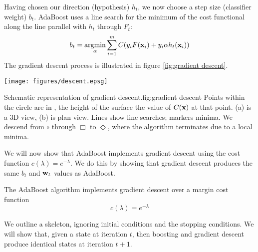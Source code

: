 Having chosen our direction (hypothesis) $h_t$, we now choose a step
size (classifier weight) $b_t$.  AdaBoost uses a line search for the
minimum of the cost functional along the line parallel with $h_t$
through $F_t$:
%
\begin{equation}
b_t = \argmin_{\alpha} \sum_{i=1}^{m} C(y_i F(\bfx_i) + y_i \alpha
h_t(\bfx_i))
\end{equation}
%
The gradient descent process is illustrated in figure
\ref{fig:gradient descent}.

\begin{linefigure}
\begin{center}
\texttt{[image: figures/descent.epsg]}
\end{center}
\begin{capt}{Schematic representation of gradient
descent.}{fig:gradient descent}
Points within the circle are in \calH, the height of the surface
the value of $C(\mathbf{x})$ at that point.  (a) is a 3D view, (b) is plan
view. Lines show line searches; markers minima.  We descend from
$\circ$ through $\Box$ to $\Diamond$, where the algorithm terminates
due to a local minima.
\end{capt}
\end{linefigure}

We will now show that AdaBoost implements gradient descent using the
cost function $c(\lambda) = e^{-\lambda}$.  We do this by showing that
gradient descent produces the same $b_t$ and $\mathbf{w}_t$ values as
AdaBoost.

\begin{theorem}
\label{thm:adaboost gradient descent}
The AdaBoost algorithm implements gradient descent over a margin cost
function
%
\begin{equation}
c(\lambda) = e^{-\lambda}
\end{equation}
\end{theorem}

\proof We outline a skeleton, ignoring initial conditions and the
stopping conditions.  We will show that, given a state at iteration
$t$, then boosting and gradient descent produce identical states at
iteration $t+1$.

